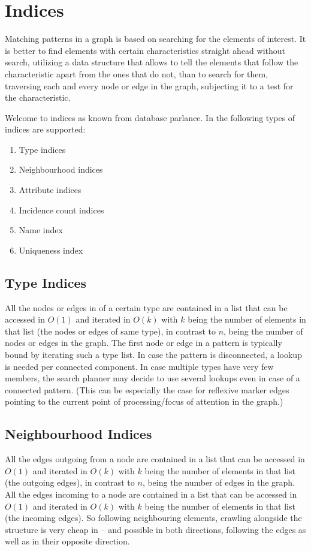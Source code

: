 \chapter{Indices}\label{cha:indices} 

Matching patterns in a graph is based on searching for the elements of interest.
It is better to find elements with certain characteristics straight ahead without search,
utilizing a data structure that allows to tell the elements that follow the characteristic apart from the ones that do not,
than to search for them, traversing each and every node or edge in the graph, subjecting it to a test for the characteristic.

Welcome to indices as known from database parlance.
In \GrG{} the following types of indices are supported:
\begin{enumerate}
	\item Type indices
	\item Neighbourhood indices
	\item Attribute indices
	\item Incidence count indices
	\item Name index
	\item Uniqueness index
\end{enumerate}

\section{Type Indices}\label{sec:typeindices}
All the nodes or edges in \GrG{} of a certain type are contained in a list that can be accessed in $O(1)$ and iterated in $O(k)$ with $k$ being the number of elements in that list (the nodes or edges of same type), in contrast to $n$, being the number of nodes or edges in the graph.
The first node or edge in a pattern is typically bound by iterating such a type list.
In case the pattern is disconnected, a lookup is needed per connected component.
In case multiple types have very few members, the search planner may decide to use several lookups even in case of a connected pattern.
(This can be especially the case for reflexive marker edges pointing to the current point of processing/focus of attention in the graph.)

\section{Neighbourhood Indices}\label{sec:neighbourhoodindices}
All the edges outgoing from a node are contained in a list that can be accessed in $O(1)$ and iterated in $O(k)$ with $k$ being the number of elements in that list (the outgoing edges), in contrast to $n$, being the number of edges in the graph.
All the edges incoming to a node are contained in a list that can be accessed in $O(1)$ and iterated in $O(k)$ with $k$ being the number of elements in that list (the incoming edges).
So following neighbouring elements, crawling alongside the structure is very cheap in \GrG{ } -- and possible in both directions, following the edges as well as in their opposite direction.

